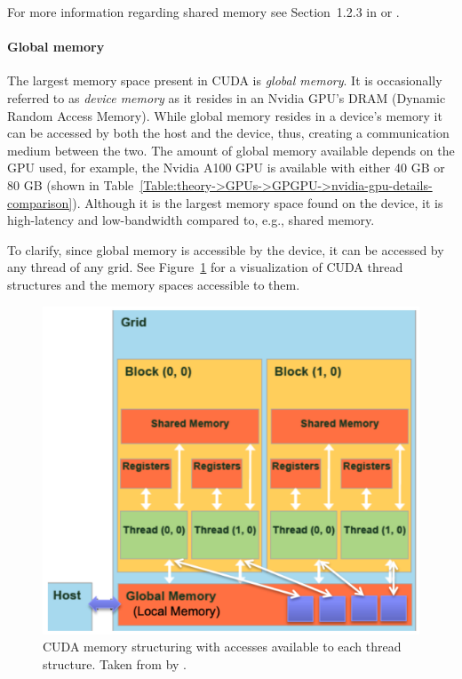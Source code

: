 For more information regarding shared memory see Section~1.2.3 in  \cite{Cejka2022} or  \cite{NVIDIADecember2022}.

\paragraph{Global memory} The largest memory space present in CUDA is \textit{global memory}.
It is occasionally referred to as \textit{device memory} as it resides in an Nvidia GPU's DRAM (Dynamic Random Access Memory).
While global memory resides in a device's memory it can be accessed by both the host and the device, thus, creating a communication medium between the two.
The amount of global memory available depends on the GPU used, for example, the Nvidia A100 GPU is available with either 40 GB or 80 GB (shown in Table~\ref{Table:theory->GPUs->GPGPU->nvidia-gpu-details-comparison}).
Although it is the largest memory space found on the device, it is high-latency and low-bandwidth compared to, e.g., shared memory.

To clarify, since global memory is accessible by the device, it can be accessed by any thread of any grid.
See Figure~\ref{Figure:theory->CUDA->memory-management->memory-spaces} for a visualization of CUDA thread structures and the memory spaces accessible to them.

\begin{figure}[ht!]
	\centering
	\includegraphics[width=12cm, keepaspectratio]{images/ch01/CUDA_memory_types_detailed.png}
	\caption{CUDA memory structuring with accesses available to each thread structure.
		Taken from  by  \cite{Hsiao17December2019}.
	}
	\label{Figure:theory->CUDA->memory-management->memory-spaces}
\end{figure}


